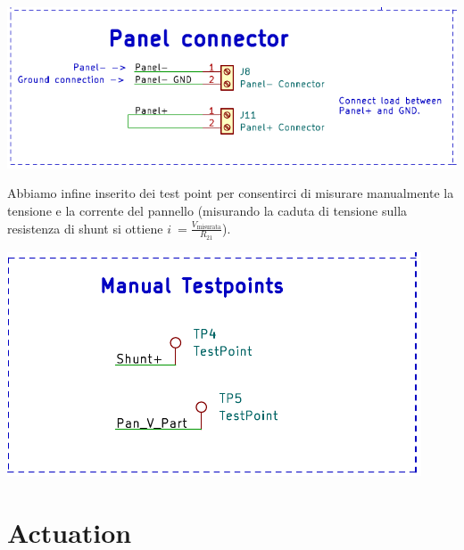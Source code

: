 \begin{center}
\includegraphics[scale=0.8]{figures/image48.png}
\captionsetup{type=figure}
\end{center}

Abbiamo infine inserito dei test point per consentirci di misurare
manualmente la tensione e la corrente del pannello (misurando la caduta
di tensione sulla resistenza di shunt si ottiene
\(i\  = \frac{V_{\text{misurata}}}{R_{21}}\)).

\begin{center}
\includegraphics[scale=0.8]{figures/image70.png}
\captionsetup{type=figure}
\end{center}

\hypertarget{actuation}{%
\section{Actuation}\label{actuation}}

